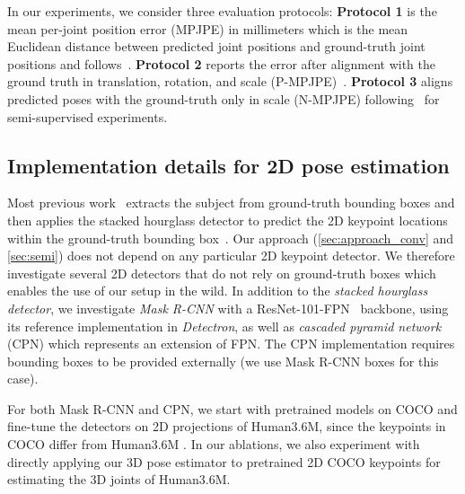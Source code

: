 \documentclass[10pt,twocolumn,letterpaper]{article}
\begin{document}
In our experiments, we consider three evaluation protocols:
\textbf{Protocol 1} is the mean per-joint position error (MPJPE) in millimeters which is the mean Euclidean distance between predicted joint positions and ground-truth joint positions and follows~\cite{li:maximum:2015, tekin:direct:2016, zhou:sparseness:2016, martinez:simple:2017, pavlakos:coarse:2017}.
\textbf{Protocol 2} reports the error after alignment with the ground truth in translation, rotation, and scale (P-MPJPE)~\cite{martinez:simple:2017, sun:compositional:2017, fang:learning:2018, pavlakos:ordinal:2018, yang:3d:2018, hossain:exploiting:2018}. 
\textbf{Protocol 3} aligns predicted poses with the ground-truth only in scale (N-MPJPE) following~\cite{rhodin:unsupervised:2018} for semi-supervised experiments.



\subsection{Implementation details for 2D pose estimation}
\label{sec:impl_keypoint}

Most previous work~\cite{martinez:simple:2017, zhou:towards:2017, tekin:learning:2017} extracts the subject from ground-truth bounding boxes and then applies the stacked hourglass detector to predict the 2D keypoint locations within the ground-truth bounding box~\cite{newell:stacked:2016}. 
Our approach (\textsection\ref{sec:approach_conv} and \textsection\ref{sec:semi}) does not depend on any particular 2D keypoint detector. 
We therefore investigate several 2D detectors that do not rely on ground-truth boxes which enables the use of our setup in the wild.
In addition to the \emph{stacked hourglass detector}, we investigate \emph{Mask R-CNN} \cite{he:mask:2017} with a ResNet-101-FPN~\cite{lin:feature:2017} backbone, using its reference implementation in \emph{Detectron}, as well as \emph{cascaded pyramid network} (CPN) \cite{chen:cascaded:2018} which represents an extension of FPN. The CPN implementation requires bounding boxes to be provided externally (we use Mask R-CNN boxes for this case). 

For both Mask R-CNN and CPN, we start with pretrained models on COCO \cite{lin:coco:2014} and fine-tune the detectors on 2D projections of Human3.6M, since the keypoints in COCO differ from Human3.6M \cite{ionescu:human36:2014}.
In our ablations, we also experiment with directly applying our 3D pose estimator to pretrained 2D COCO keypoints for estimating the 3D joints of Human3.6M.
\end{document}
